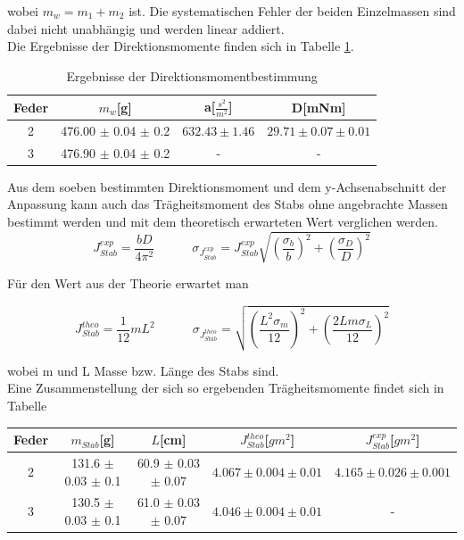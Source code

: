 \documentclass[12pt,a4paper]{article}
\begin{document}
wobei $m_w=m_1+m_2$ ist. Die systematischen Fehler der beiden Einzelmassen sind dabei nicht unabhängig und werden linear addiert.\\
Die Ergebnisse der Direktionsmomente finden sich in Tabelle \ref{tab:Direktionsmomente}.

\begin{table}
\caption{Ergebnisse der Direktionsmomentbestimmung}
\begin{center}
\begin{tabular}{|c|c|c|c|}
\hline
Feder & $m_w$[g] & a[$\frac{s^2}{m^2}$] & D[mNm]\\
\hline
2 & 476.00 $\pm$ 0.04 $\pm$ 0.2 & $632.43 \pm 1.46$ & $29.71 \pm 0.07 \pm 0.01$ \\
\hline
3 & 476.90 $\pm$ 0.04 $\pm$ 0.2 & - &  - \\
\hline
\end{tabular}
\end{center}
\label{tab:Direktionsmomente}
\end{table}

Aus dem soeben bestimmten Direktionsmoment und dem y-Achsenabschnitt der Anpassung kann auch das Trägheitsmoment des Stabs ohne angebrachte Massen bestimmt werden und mit dem theoretisch erwarteten Wert verglichen werden.\\

\begin{equation}
J_{Stab}^{exp}=\frac{bD}{4\pi^2} \quad \quad \quad
\sigma_{J_{Stab}^{exp}}=J_{Stab}^{exp} \sqrt{(\frac{\sigma_b}{b})^2+(\frac{\sigma_D}{D})^2}
\end{equation}

Für den Wert aus der Theorie erwartet man

\begin{equation}
J_{Stab}^{theo}=\frac{1}{12} m L^2 \quad \quad \quad
\sigma_{J_{Stab}^{theo}}=\sqrt{(\frac{L^2 \sigma_m}{12})^2+(\frac{2Lm\sigma_L}{12})^2}
\end{equation}

wobei m und L Masse bzw. Länge des Stabs sind.\\
Eine Zusammenstellung der sich so ergebenden Trägheitsmomente findet sich in Tabelle


\begin{table}
\begin{center}
\begin{tabular}{|c|c|c|c|c|}
\hline
Feder & $m_{Stab}$[g] & $L$[cm] & $J_{Stab}^{theo}$[$g m^2$] & $J_{Stab}^{exp}$[$g m^2$]\\
\hline
2 & 131.6 $\pm$ 0.03 $\pm$ 0.1 & 60.9 $\pm$ 0.03 $\pm$ 0.07 & $4.067 \pm 0.004 \pm 0.01 $ & $ 4.165 \pm 0.026 \pm 0.001 $ \\
\hline
3 & 130.5 $\pm$ 0.03 $\pm$ 0.1 & 61.0 $\pm$ 0.03 $\pm$ 0.07 & $4.046 \pm 0.004 \pm  0.01 $ & - \\
\hline
\end{tabular}
\end{center}
\end{table}
\end{document}
